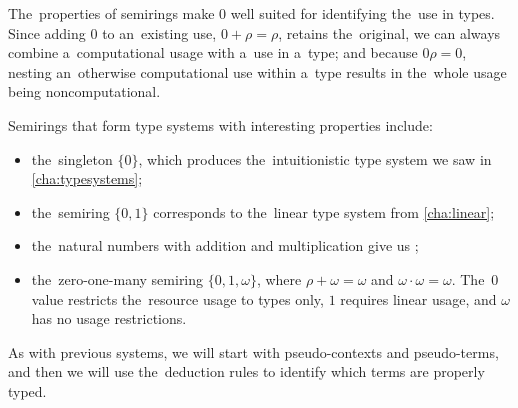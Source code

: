 The~properties of semirings make $0$ well suited for identifying the~use in
types. Since adding $0$ to an~existing use, $0 + \rho = \rho$, retains
the~original, we can always combine a~computational usage with a~use in a~type;
and because $0\rho = 0$, nesting an~otherwise computational use within a~type
results in the~whole usage being noncomputational.

Semirings that form type systems with interesting properties include:
\begin{itemize}
  \item the~singleton $\{0\}$, which produces the~intuitionistic type system we
    saw in \autoref{cha:typesystems};
  \item the~semiring $\{0, 1\}$ corresponds to the~linear type system from
    \autoref{cha:linear};
  \item the~natural numbers with addition and multiplication give us
    \todo{[WHAT?]};
  \item the~zero-one-many semiring $\{0, 1, \omega\}$, where $\rho + \omega =
    \omega$ and $\omega \cdot \omega = \omega$. The~$0$ value restricts
    the~resource usage to types only, $1$ requires linear usage, and $\omega$
    has no usage restrictions.
\end{itemize}


As with previous systems, we will start with pseudo-contexts and pseudo-terms,
and then we will use the~deduction rules to identify which terms are properly
typed.

